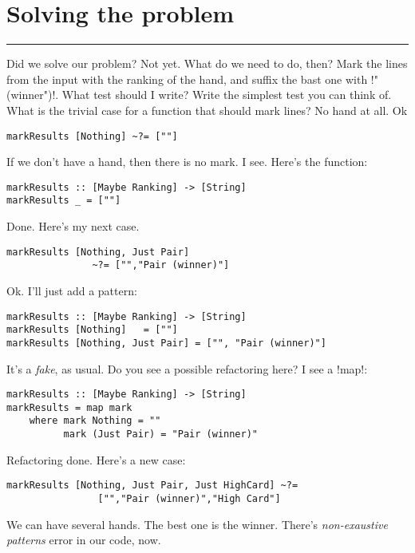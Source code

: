 \newpage
\section{Solving the problem} 
\vspace{10cm}
\hrule

\lhQ Did we solve our problem?
\lhA Not yet. 
\lhN What do we need to do, then?
\lhA Mark the lines from the input with the ranking of the hand, and suffix the bast one with \il!"(winner")!.
\lhN What test should I write?
\lhA Write the simplest test you can think of.
\lhN What is the trivial case for a function that should mark lines?
\lhA No hand at all.
\lhN Ok
\begin{lstlisting}[frame=single]
markResults [Nothing] ~?= [""]
\end{lstlisting}
If we don't have a hand, then there is no mark.
\lhA \error I see. Here's the function:
\begin{lstlisting}[frame=single]
markResults :: [Maybe Ranking] -> [String]
markResults _ = [""]
\end{lstlisting}
\success Done.
\lhN Here's my next case. 
\begin{lstlisting}[frame=single]
markResults [Nothing, Just Pair] 
               ~?= ["","Pair (winner)"]
\end{lstlisting}
\lhA \failure Ok. I'll just add a pattern:
\begin{lstlisting}[frame=single]
markResults :: [Maybe Ranking] -> [String]
markResults [Nothing]   = [""]
markResults [Nothing, Just Pair] = ["", "Pair (winner)"]
\end{lstlisting}
\success It's a \emph{fake}, as usual.
\lhN Do you see a possible refactoring here?
\lhA I see a \il!map!:
\begin{lstlisting}[frame=single]
markResults :: [Maybe Ranking] -> [String]
markResults = map mark
    where mark Nothing = ""
          mark (Just Pair) = "Pair (winner)"
\end{lstlisting}
\success Refactoring done.
\lhN Here's a new case:
\begin{lstlisting}[frame=single]
markResults [Nothing, Just Pair, Just HighCard] ~?= 
                ["","Pair (winner)","High Card"]
\end{lstlisting}
\error We can have several hands. The best one is the winner.
There's \emph{non-exaustive patterns} error in our code, now.
